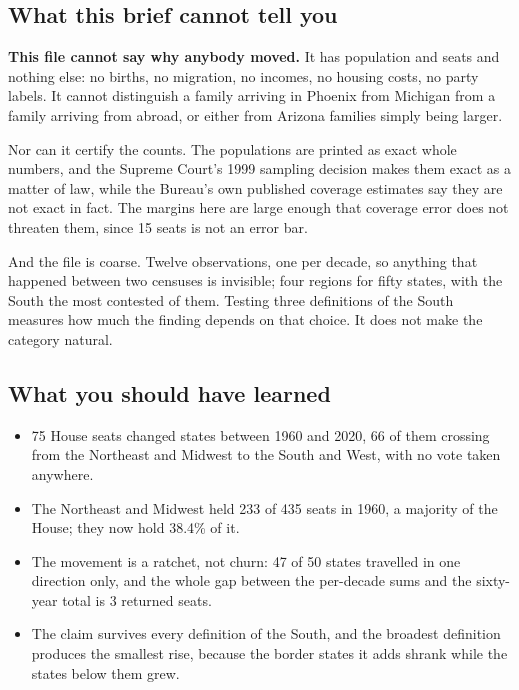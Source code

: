\documentclass[
]{article}
\providecommand{\tightlist}{%
  \setlength{\itemsep}{0pt}\setlength{\parskip}{0pt}}
\begin{document}
\subsection{What this brief cannot tell
you}\label{what-this-brief-cannot-tell-you}

\textbf{This file cannot say why anybody moved.} It has population and
seats and nothing else: no births, no migration, no incomes, no housing
costs, no party labels. It cannot distinguish a family arriving in
Phoenix from Michigan from a family arriving from abroad, or either from
Arizona families simply being larger.

Nor can it certify the counts. The populations are printed as exact
whole numbers, and the Supreme Court's 1999 sampling decision makes them
exact as a matter of law, while the Bureau's own published coverage
estimates say they are not exact in fact. The margins here are large
enough that coverage error does not threaten them, since 15 seats is not
an error bar.

And the file is coarse. Twelve observations, one per decade, so anything
that happened between two censuses is invisible; four regions for fifty
states, with the South the most contested of them. Testing three
definitions of the South measures how much the finding depends on that
choice. It does not make the category natural.

\subsection{What you should have
learned}\label{what-you-should-have-learned}

\begin{itemize}
\tightlist
\item
  75 House seats changed states between 1960 and 2020, 66 of them
  crossing from the Northeast and Midwest to the South and West, with no
  vote taken anywhere.
\item
  The Northeast and Midwest held 233 of 435 seats in 1960, a majority of
  the House; they now hold 38.4\% of it.
\item
  The movement is a ratchet, not churn: 47 of 50 states travelled in one
  direction only, and the whole gap between the per-decade sums and the
  sixty-year total is 3 returned seats.
\item
  The claim survives every definition of the South, and the broadest
  definition produces the smallest rise, because the border states it
  adds shrank while the states below them grew.
\end{itemize}
\end{document}
